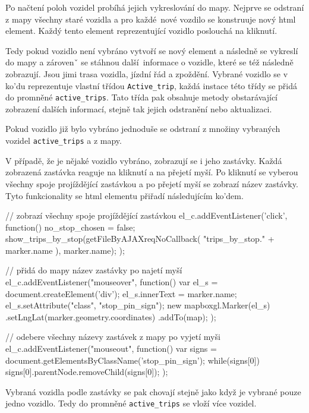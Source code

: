 Po načtení poloh vozidel probíhá jejich vykreslování do mapy. Nejprve se odstraní z mapy všechny staré vozidla a pro každé nové vozdilo se konstruuje nový \gls{html} element. Každý tento element reprezentující vozidlo poslouchá na kliknutí.

\bigbreak

Tedy pokud vozidlo není vybráno vytvoří se nový element a následně se vykreslí do mapy a zárovenˇ se stáhnou další informace o vozidle, které se též následně zobrazují. Jsou jimi trasa vozidla, jízdní řád a zpoždění. Vybrané vozidlo se v ko'du reprezentuje vlastní třídou \verb-Active_trip-, každá instace této třídy se přidá do promněné \verb-active_trips-. Tato třída pak obsahuje metody obstarávající zobrazení dalších informací, stejně tak jejich odstranění nebo aktualizaci.

\bigbreak

Pokud vozidlo již bylo vybráno jednoduše se odstraní z množiny vybraných vozidel \verb-active_trips- a z mapy.

\bigbreak

V případě, že je nějaké vozidlo vybráno, zobrazují se i jeho zastávky. Každá zobrazená zastávka reaguje na kliknutí a na přejetí myší. Po kliknutí se vyberou všechny spoje projíždějící zastávkou a po přejetí myší se zobrazí název zastávky. Tyto funkcionality se \gls{html} elementu přiřadí následujícím ko'dem.

\begin{code}[frame=none]
// zobrazí všechny spoje projíždějící zastávkou
el_c.addEventListener('click', function() {
  no_stop_chosen = false;
  show_trips_by_stop(getFileByAJAXreqNoCallback(
    "trips_by_stop." + marker.name
  ), marker.name);
});

// přidá do mapy název zastávky po najetí myší
el_c.addEventListener("mouseover", function(){
  var el_s = document.createElement('div');
  el_s.innerText = marker.name;
  el_s.setAttribute("class", "stop_pin_sign");
  new mapboxgl.Marker(el_s)
    .setLngLat(marker.geometry.coordinates)
    .addTo(map);
});

// odebere všechny názevy zastávek z mapy po vyjetí myši
el_c.addEventListener("mouseout", function(){
  var signs = document.getElementsByClassName('stop_pin_sign');
  while(signs[0]) {
    signs[0].parentNode.removeChild(signs[0]);
  }
});
\end{code}

Vybraná vozidla podle zastávky se pak chovají stejně jako když je vybrané pouze jedno vozidlo. Tedy do promněné \verb-active_trips- se vloží více vozidel.

